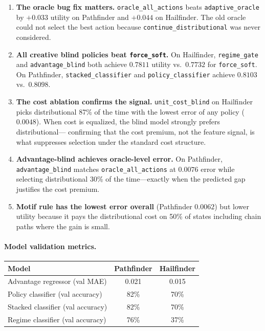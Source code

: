 \documentclass[11pt,openany]{report}
\begin{document}
\begin{enumerate}
\item \textbf{The oracle bug fix matters.}
  \texttt{oracle\_all\_actions} beats \texttt{adaptive\_oracle} by
  $+0.033$ utility on Pathfinder and $+0.044$ on Hailfinder.
  The old oracle could not select the best action because
  \texttt{continue\_distributional} was never considered.

\item \textbf{All creative blind policies beat \texttt{force\_soft}.}
  On Hailfinder, \texttt{regime\_gate} and \texttt{advantage\_blind}
  both achieve $0.7811$ utility vs.\ $0.7732$ for \texttt{force\_soft}.
  On Pathfinder, \texttt{stacked\_classifier} and
  \texttt{policy\_classifier} achieve $0.8103$ vs.\ $0.8098$.

\item \textbf{The cost ablation confirms the signal.}
  \texttt{unit\_cost\_blind} on Hailfinder picks distributional 87\%
  of the time with the lowest error of any policy ($0.0048$).  When
  cost is equalized, the blind model strongly prefers distributional---
  confirming that the cost premium, not the feature signal, is
  what suppresses selection under the standard cost structure.

\item \textbf{Advantage-blind achieves oracle-level error.}
  On Pathfinder, \texttt{advantage\_blind} matches
  \texttt{oracle\_all\_actions} at $0.0076$ error while selecting
  distributional 30\% of the time---exactly when the predicted gap
  justifies the cost premium.

\item \textbf{Motif rule has the lowest error overall} (Pathfinder
  $0.0062$) but lower utility because it pays the distributional cost
  on 50\% of states including chain paths where the gain is small.
\end{enumerate}

\paragraph{Model validation metrics.}

\begin{center}
\begin{tabular}{lcc}
\toprule
\textbf{Model} & \textbf{Pathfinder} & \textbf{Hailfinder} \\
\midrule
Advantage regressor (val MAE) & 0.021 & 0.015 \\
Policy classifier (val accuracy) & 82\% & 70\% \\
Stacked classifier (val accuracy) & 82\% & 70\% \\
Regime classifier (val accuracy) & 76\% & 37\% \\
\bottomrule
\end{tabular}
\end{center}
\end{document}
